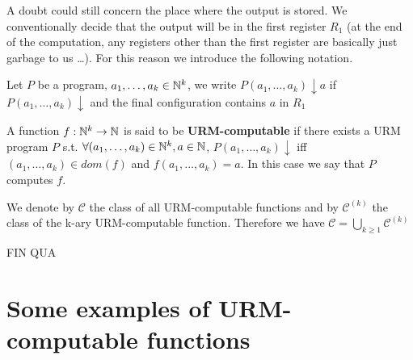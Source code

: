 A doubt could still concern the place where the output is stored. We conventionally decide that the output will be in the first register $R_1$ (at the end of the computation, any registers other than the first register are basically just garbage to us \dots). For this reason we introduce the following notation.

\begin{notation}
  Let $P$ be a program, $a_1,\dots,a_k \in \mathbb{N}^k$, we write
  $P(a_1,\dots,a_k)\downarrow a$ if $P(a_1,\dots,a_k) \downarrow$ and
  the final configuration contains $a$ in $R_1$
\end{notation}

\begin{definition}
  A function $f:\mathbb{N}^k\rightarrow\mathbb{N}$ is said to be
  \textbf{URM-computable} if there exists a URM program $P$ s.t.
  $\forall (a_1,\dots,a_k) \in \mathbb{N}^k, a\in\mathbb{N}$,
  $P(a_1,\dots,a_k)\downarrow$ iff $(a_1,\dots,a_k)\in dom(f)$ and
  $f(a_1,\dots,a_k) = a$. In this case we say that $P$ computes $f$.

  We denote by $\mathcal{C}$ the class of all URM-computable
  functions and by $\mathcal{C}^{(k)}$ the class of the k-ary
  URM-computable function.
  Therefore we have
  $\mathcal{C} = \bigcup_{k\geq 1} \mathcal{C}^{(k)}$
\end{definition}

FIN QUA

\section{Some examples of URM-computable functions}

